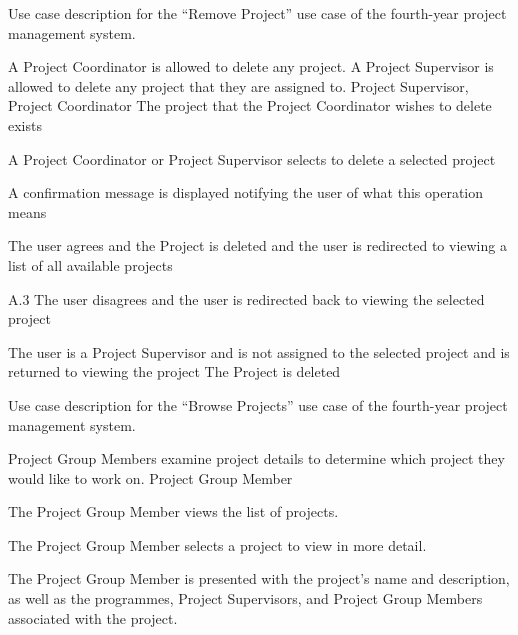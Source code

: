 \documentclass[document.tex]{subfiles}
\begin{document}
\begin{table}[!htbp]
  \centering
  \caption{Use case description for the ``Remove Project'' use case of the fourth-year project management system.}
  \label{tbl:use-case-delete-project}

  \begin{usecase}
    A Project Coordinator is allowed to delete any project. A Project Supervisor is allowed to delete any project that they are assigned to.
    Project Supervisor, Project Coordinator
    The project that the Project Coordinator wishes to delete exists
    \ucnormal
    \begin{ucenum}
      \item A Project Coordinator or Project Supervisor selects to delete a selected project
      \item A confirmation message is displayed notifying the user of what this operation means
      \item The user agrees and the Project is deleted and the user is redirected to viewing a list of all available projects
    \end{ucenum}
    \begin{ucenum}
      \item [A.3] The user disagrees and the user is redirected back to viewing the selected project
    \end{ucenum}
    The user is a Project Supervisor and is not assigned to the selected project and is returned to viewing the project
    The Project is deleted
  \end{usecase}
\end{table}


\begin{table}[!htbp]
  \centering
  \caption{Use case description for the ``Browse Projects'' use case of the fourth-year project management system.}
  \label{tbl:use-case-view-project}

  \begin{usecase}
    Project Group Members examine project details to determine which project they would like to work on.
    Project Group Member
    \ucnormal
    \begin{ucenum}
      \item The Project Group Member views the list of projects.
      \item The Project Group Member selects a project to view in more detail.
      \item The Project Group Member is presented with the project's name and description, as well as the programmes, Project Supervisors, and Project Group Members associated with the project.
    \end{ucenum}
  \end{usecase}
\end{table}
\end{document}
